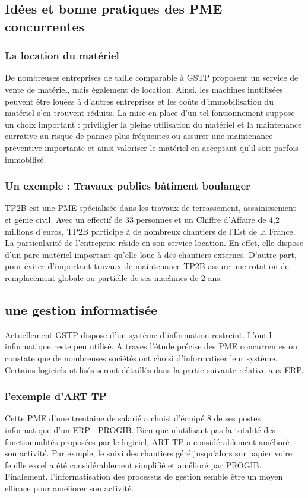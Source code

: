 \subsection{Idées et bonne pratiques des PME concurrentes}
\subsubsection{La location du matériel}
De nombreuses entreprises de taille comparable à GSTP proposent un service de vente de matériel, mais également de location. 
Ainsi, les machines inutilisées peuvent être louées à d'autres entreprises et les coûts d'immobilisation du matériel s'en trouvent réduits. 
La mise en place d'un tel fontionnement suppose un choix important : 
priviligier la pleine utilisation du matériel et la maintenance currative au risque de pannes plus fréquentes
ou assurer une maintenance préventive importante et ainsi valoriser le matériel en acceptant qu'il soit parfois immobilisé.
\subsubsection{Un exemple : Travaux publics bâtiment boulanger}
TP2B est une PME spécialisée dans les travaux de terrassement, assainissement et génie civil. Avec un effectif de 33 personnes et un Chiffre d'Affaire de 4,2 millions d'euros,
TP2B participe à de nombreux chantiers de l'Est de la France. La particularité de l'entreprise réside en son service location. En effet, elle dispose d'un parc matériel important qu'elle loue 
à des chantiers externes. D'autre part, pour éviter d'important travaux de maintenance TP2B assure une rotation de remplacement globale ou partielle de ses machines de 2 ans.

\subsection{une gestion informatisée}
Actuellement GSTP dispose d'un système d'information restreint. L'outil informatique reste peu utilisé.
A traves l'étude précise des PME concurrentes on constate que de nombreuses sociétés ont choisi d'informatiser leur système.
Certains logiciels utilisés seront détaillés dans la partie suivante relative aux ERP.

\subsubsection{l'exemple d'ART TP}
Cette PME d'une trentaine de salarié a choisi d'équipé 8 de ses postes informatique d'un ERP : PROGIB. Bien que n'utilisant pas la totalité 
des fonctionnalités proposées par le logiciel, ART TP a considérablement amélioré son activité. Par exmple, le suivi des chantiers géré jusqu'alors sur papier voire feuille excel
a été considérablement simplifié et amélioré par PROGIB.
Finalement, l'informatisation des processus de gestion semble être un moyen efficace pour améliorer son activité.


